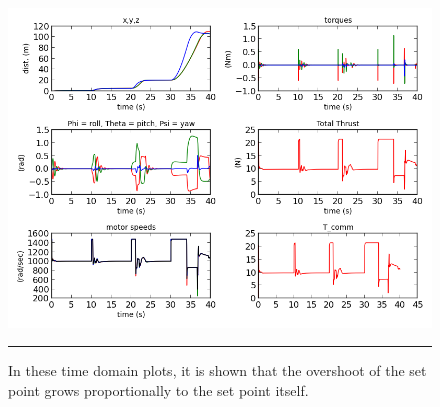 \begin{figure}[htbp]
	\centering
		\includegraphics[scale = 0.5]{Figures/largeSetpointDifferencesTest_timedomain.png}
		\rule{35em}{0.5pt}
	\caption[Large Set Point Time Domain]{In these time domain plots, it is shown that the overshoot of the set point grows proportionally to the set point itself. }
	\label{fig:Large Setpoint Time Domain}
\end{figure}





